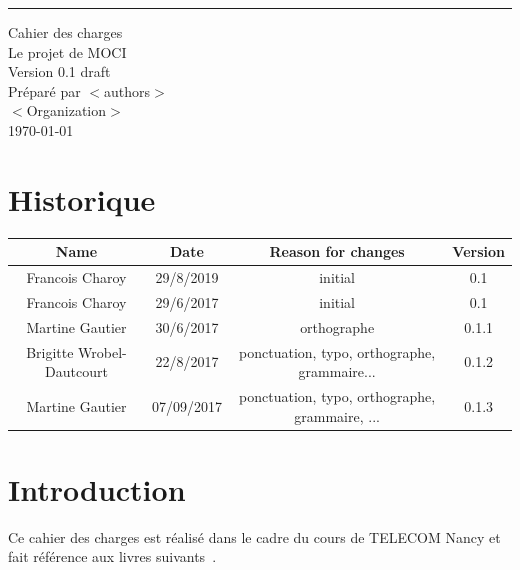 \documentclass{scrreprt}
\date{}
\def\myversion{0.1 }
\begin{document}
\renewcommand*{\glsclearpage}{}
\begin{flushright}
    \rule{16cm}{5pt}\vskip1cm
    \begin{bfseries}
        \Huge{Cahier des charges}\\
        \vspace{1.9cm}
        Le projet de MOCI\\
        \vspace{1.9cm}
        \LARGE{Version \myversion draft}\\
        \vspace{1.9cm}
        Préparé par $<$authors$>$\\
        \vspace{1.9cm}
        $<$Organization$>$\\
        \vspace{1.9cm}
        \today\\
    \end{bfseries}
\end{flushright}

\tableofcontents

\chapter*{Historique}

\begin{center}
    \begin{tabular}{|c|c|c|c|}
        \hline
	    Name & Date & Reason for changes & Version\\
        \hline
	    Francois Charoy & 29/8/2019 & initial & 0.1\\
        \hline
	    Francois Charoy & 29/6/2017 & initial & 0.1\\
        \hline
	    Martine Gautier & 30/6/2017 & orthographe & 0.1.1\\
        \hline
        Brigitte Wrobel-Dautcourt & 22/8/2017 & ponctuation, typo, orthographe, grammaire... & 0.1.2\\
        \hline
        Martine Gautier & 07/09/2017 & ponctuation, typo, orthographe, grammaire, ... & 0.1.3\\
        \hline
    \end{tabular}
\end{center}

\chapter{Introduction}
Ce cahier des charges est réalisé dans le cadre du cours de TELECOM Nancy  et fait référence aux livres suivants~\cite{Sommerville:2010:SE:1841764,Pohl:2010:REF:1869735,Rumbaugh:2004:UML:993859}.
\end{document}

